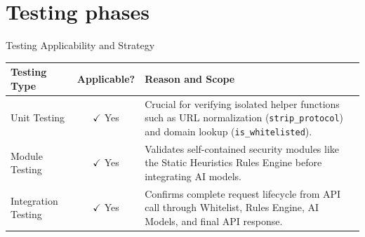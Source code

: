 \documentclass[aspectratio=169,xcolor=dvipsnames]{beamer}
\begin{document}
\section{Testing phases}
\begin{frame}{Testing Applicability and Strategy}

\begin{table}[h]
\centering
\small
\begin{tabular}{|l|c|p{5cm}|}
\hline
\textbf{Testing Type} & \textbf{Applicable?} & \textbf{Reason and Scope} \\ \hline

Unit Testing & $\checkmark$ Yes & 
Crucial for verifying isolated helper functions such as URL normalization (\texttt{strip\_protocol}) and domain lookup (\texttt{is\_whitelisted}). \\ \hline

Module Testing & $\checkmark$ Yes & 
Validates self-contained security modules like the Static Heuristics Rules Engine before integrating AI models. \\ \hline

Integration Testing & $\checkmark$ Yes & 
Confirms complete request lifecycle from API call through Whitelist, Rules Engine, AI Models, and final API response. \\ \hline

\end{tabular}
\end{table}

\end{frame}
\end{document}
